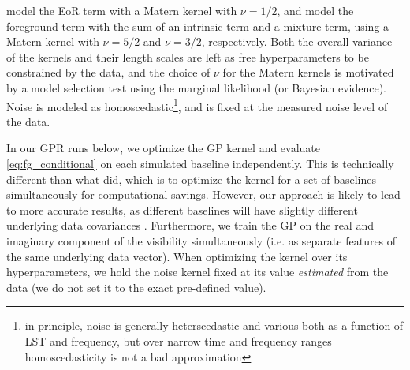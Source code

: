 \documentclass[a4paper,fleqn,usenatbib]{mnras}
\begin{document}
 model the EoR term with a Matern kernel with $\nu=1/2$, and model the foreground term with the sum of an intrinsic term and a mixture term, using a Matern kernel with $\nu=5/2$ and $\nu=3/2$, respectively.
Both the overall variance of the kernels and their length scales are left as free hyperparameters to be constrained by the data, and the choice of $\nu$ for the Matern kernels is motivated by a model selection test using the marginal likelihood (or Bayesian evidence).
Noise is modeled as homoscedastic\footnote{in principle, noise is generally heterscedastic and various both as a function of LST and frequency, but over narrow time and frequency ranges homoscedasticity is not a bad approximation}, and is fixed at the measured noise level of the data.






In our GPR runs below, we optimize the GP kernel and evaluate \autoref{eq:fg_conditional} on each simulated baseline independently.
This is technically different than what  did, which is to optimize the kernel for a set of baselines simultaneously for computational savings.
However, our approach is likely to lead to more accurate results, as different baselines will have slightly different underlying data covariances \citep{Ghosh2020}.
Furthermore, we train the GP on the real and imaginary component of the visibility simultaneously (i.e. as separate features of the same underlying data vector).
When optimizing the kernel over its hyperparameters, we hold the noise kernel fixed at its value \emph{estimated} from the data (we do not set it to the exact pre-defined value).
\end{document}
